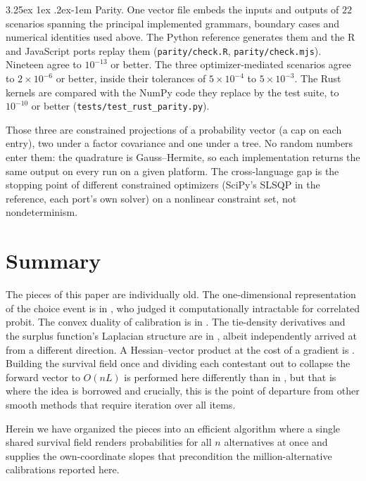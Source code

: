 \documentclass[11pt]{article}
\makeatletter
\renewcommand\paragraph{\@startsection{paragraph}{4}{\z@}%
  {3.25ex \@plus1ex \@minus.2ex}{-1em}%
  {\normalfont\normalsize\itshape}}
\makeatother
\begin{document}
\paragraph{Parity.} One vector file embeds the inputs and outputs of
$22$ scenarios spanning the principal implemented grammars, boundary
cases and numerical identities used above. The Python reference
generates them and the R and JavaScript ports replay them
(\texttt{parity/check.R}, \texttt{parity/check.mjs}). Nineteen agree to
$10^{-13}$ or better. The three optimizer-mediated scenarios agree to
$2\times10^{-6}$ or better, inside their tolerances of $5\times10^{-4}$
to $5\times10^{-3}$. The Rust kernels are compared with the NumPy code
they replace by the test suite, to $10^{-10}$ or better
(\texttt{tests/test\_rust\_parity.py}).

Those three are constrained projections of a probability vector (a cap
on each entry), two under a factor covariance and one under a tree. No
random numbers enter them: the quadrature is Gauss--Hermite, so each
implementation returns the same output on every run on a given platform.
The cross-language gap is the stopping point of different constrained
optimizers (SciPy's SLSQP in the reference, each port's own solver)
on a nonlinear constraint set, not nondeterminism.

\section{Summary}\label{sec:summary}

The pieces of this paper are individually old. The one-dimensional
representation of the choice event is in \citet{domencich1975}, who
judged it computationally intractable for correlated probit. The convex
duality of calibration is in \citet{li2018}. The tie-density
derivatives and the surplus function's Laplacian structure are in
\citet{muller2022}, albeit independently arrived at from a different direction. A Hessian--vector product at the cost of a gradient
is \citet{pearlmutter1994}. Building the survival field once and dividing each contestant out to collapse the forward vector to $O(nL)$ is performed here differently than in \citet{cotton2021}, but that is where the idea is borrowed and crucially, this is the point of departure from other smooth methods that require iteration over all items.

Herein we have organized the pieces into an efficient algorithm where a
single shared survival field renders probabilities for all $n$
alternatives at once and supplies the own-coordinate slopes that
precondition the million-alternative calibrations reported here.
\end{document}
